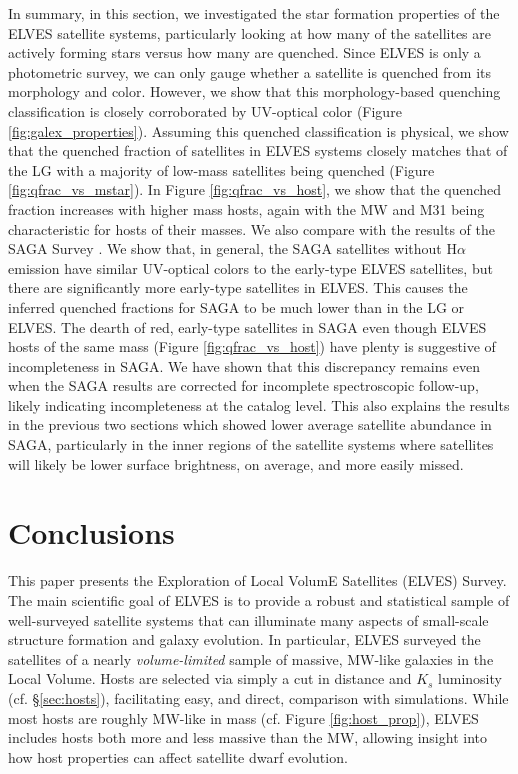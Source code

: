 \documentclass[twocolumn]{aastex62}
\begin{document}
In summary, in this section, we investigated the star formation properties of the ELVES satellite systems, particularly looking at how many of the satellites are actively forming stars versus how many are quenched. Since ELVES is only a photometric survey, we can only gauge whether a satellite is quenched from its morphology and color. However, we show that this morphology-based quenching classification is closely corroborated by UV-optical color (Figure \ref{fig:galex_properties}). Assuming this quenched classification is physical, we show that the quenched fraction of satellites in ELVES systems closely matches that of the LG with a majority of low-mass satellites being quenched (Figure \ref{fig:qfrac_vs_mstar}). In Figure \ref{fig:qfrac_vs_host}, we show that the quenched fraction increases with higher mass hosts, again with the MW and M31 being characteristic for hosts of their masses. We also compare with the results of the SAGA Survey \citep{geha2017, mao2020}. We show that, in general, the SAGA satellites without H$\alpha$ emission have similar UV-optical colors to the early-type ELVES satellites, but there are significantly more early-type satellites in ELVES. This causes the inferred quenched fractions for SAGA to be much lower than in the LG or ELVES. The dearth of red, early-type satellites in SAGA even though ELVES hosts of the same mass (Figure \ref{fig:qfrac_vs_host}) have plenty is suggestive of incompleteness in SAGA. We have shown that this discrepancy remains even when the SAGA results are corrected for incomplete spectroscopic follow-up, likely indicating incompleteness at the catalog level. This also explains the results in the previous two sections which showed lower average satellite abundance in SAGA, particularly in the inner regions of the satellite systems where satellites will likely be lower surface brightness, on average, and more easily missed.













\section{Conclusions}
\label{sec:conclusions}

This paper presents the Exploration of Local VolumE Satellites (ELVES) Survey. The main scientific goal of ELVES is to provide a robust and statistical sample of well-surveyed satellite systems that can illuminate many aspects of small-scale structure formation and galaxy evolution. In particular, ELVES surveyed the satellites of a nearly \textit{volume-limited} sample of massive, MW-like galaxies in the Local Volume. Hosts are selected via simply a cut in distance and $K_s$ luminosity (cf. \S\ref{sec:hosts}), facilitating easy, and direct, comparison with simulations. While most hosts are roughly MW-like in mass (cf. Figure \ref{fig:host_prop}), ELVES includes hosts both more and less massive than the MW, allowing insight into how host properties can affect satellite dwarf evolution.
\end{document}

